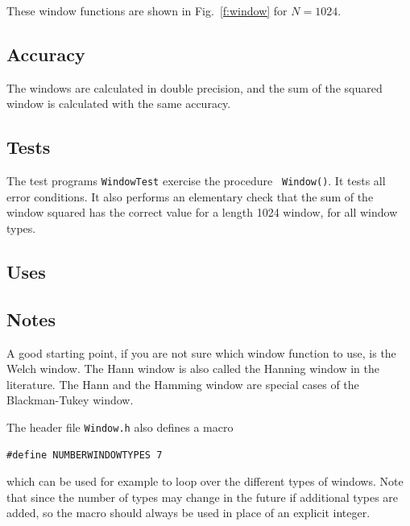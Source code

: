 \documentclass{article}
\begin{document}
These window functions are shown in Fig.~\ref{f:window} for $N=1024$.


\subsection{Accuracy}


The windows are calculated in double precision, and the sum of the squared
window is calculated with the same accuracy.

\subsection{Tests}


The test programs {\tt WindowTest\/} exercise the procedure {\tt
Window()\/}.  It tests all error conditions.  It also performs an
elementary check that the sum of the window squared has the correct
value for a length 1024 window, for all window types.

\subsection{Uses}


\subsection{Notes}

A good starting point, if you are not sure which window function to use,
is the Welch window.  The Hann window is also called the Hanning window
in the literature.  The Hann and the Hamming window are special cases of
the Blackman-Tukey window.

\noindent
The header file {\tt Window.h} also defines a macro
\begin{verbatim}
#define NUMBERWINDOWTYPES 7
\end{verbatim}
which can be used for example to loop over the different types of windows.
Note that since the number of types may change in the future if additional
types are added, so the macro should always be used in place of an
explicit integer.
\end{document}
